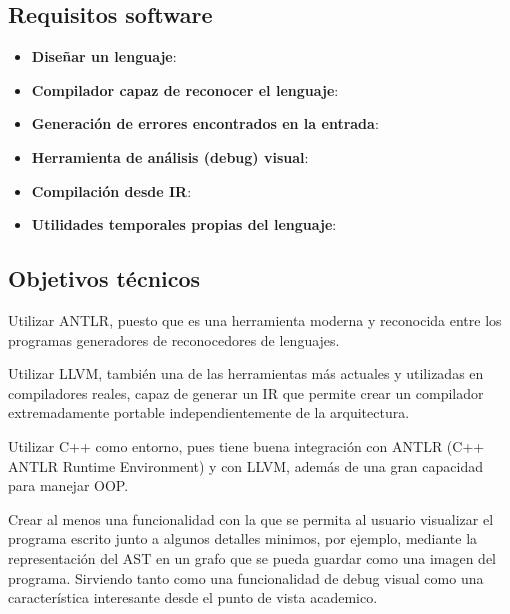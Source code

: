 
\subsection{Requisitos software}
\begin{itemize}
    \item \textbf{Diseñar un lenguaje}:
    \item \textbf{Compilador capaz de reconocer el lenguaje}:
    \item \textbf{Generación de errores encontrados en la entrada}:
    \item \textbf{Herramienta de análisis (debug) visual}:
    \item \textbf{Compilación desde IR}:
    \item \textbf{Utilidades temporales propias del lenguaje}:
\end{itemize}

\subsection{Objetivos técnicos}
Utilizar ANTLR, puesto que es una herramienta moderna y reconocida entre los programas generadores de reconocedores de lenguajes.

Utilizar LLVM, también una de las herramientas más actuales y utilizadas en compiladores reales, capaz de generar un IR que permite crear un compilador extremadamente portable independientemente de la arquitectura.

Utilizar C++ como entorno, pues tiene buena integración con ANTLR (C++ ANTLR Runtime Environment) y con LLVM, además de una gran capacidad para manejar OOP.

Crear al menos una funcionalidad con la que se permita al usuario visualizar el programa escrito junto a algunos detalles minimos, por ejemplo, mediante la representación del AST en un grafo que se pueda guardar como una imagen del programa. Sirviendo tanto como una funcionalidad de debug visual como una característica interesante desde el punto de vista academico.